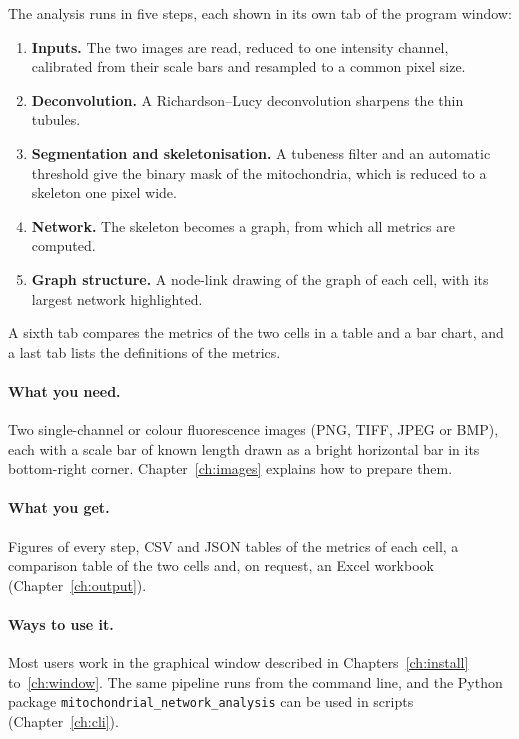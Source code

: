 \documentclass[fontsize=10.5pt,paper=a4,parskip=half,headings=normal,numbers=noenddot,
  open=any,captions=tableheading]{scrreprt}
\newcommand{\file}[1]{\texttt{#1}}
\begin{document}
The analysis runs in five steps, each shown in its own tab of the program window:
\begin{enumerate}
\item \textbf{Inputs.} The two images are read, reduced to one intensity channel, calibrated from their scale bars and resampled to a common pixel size.
\item \textbf{Deconvolution.} A Richardson--Lucy deconvolution sharpens the thin tubules.
\item \textbf{Segmentation and skeletonisation.} A tubeness filter and an automatic threshold give the binary mask of the mitochondria, which is reduced to a skeleton one pixel wide.
\item \textbf{Network.} The skeleton becomes a graph, from which all metrics are computed.
\item \textbf{Graph structure.} A node-link drawing of the graph of each cell, with its largest network highlighted.
\end{enumerate}
A sixth tab compares the metrics of the two cells in a table and a bar chart, and a last tab lists the definitions of the metrics.

\paragraph{What you need.} Two single-channel or colour fluorescence images (PNG, TIFF, JPEG or BMP), each with a scale bar of known length drawn as a bright horizontal bar in its bottom-right corner. Chapter~\ref{ch:images} explains how to prepare them.

\paragraph{What you get.} Figures of every step, CSV and JSON tables of the metrics of each cell, a comparison table of the two cells and, on request, an Excel workbook (Chapter~\ref{ch:output}).

\paragraph{Ways to use it.} Most users work in the graphical window described in Chapters~\ref{ch:install} to~\ref{ch:window}. The same pipeline runs from the command line, and the Python package \file{mitochondrial\_network\_analysis} can be used in scripts (Chapter~\ref{ch:cli}).

\end{document}
